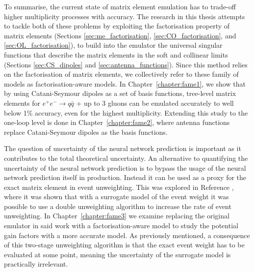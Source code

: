 \documentclass[main.tex]{subfiles}
\begin{document}
    To summarise, the current state of matrix element
    emulation has to trade-off higher multiplicity processes
    with accuracy. The research in this thesis attempts to
    tackle both of these problems by exploiting the factorisation
    property of matrix elements (Sections \ref{sec:me_factorisation},
    \ref{sec:CO_factorisation}, and \ref{sec:OL_factorisation}),
    to build into the emulator the universal singular functions
    that describe the matrix elements in the soft and collinear limits
    (Sections \ref{sec:CS_dipoles} and \ref{sec:antenna_functions}).
    Since this method relies on the factorisation of matrix
    elements, we collectively refer to these family of models
    as factorisation-aware models.
    In Chapter~\ref{chapter:fame1}, we show that by using
    Catani-Seymour dipoles as a set of basis functions, tree-level
    matrix elements for $e^{+}e^{-} \rightarrow q \bar{q}$ + up to 3 gluons
    can be emulated accurately to well below 1\% accuracy,
    even for the highest multiplicity. Extending this study
    to the one-loop level is done in Chapter~\ref{chapter:fame2},
    where antenna functions replace Catani-Seymour dipoles as
    the basis functions.

    The question of uncertainty of the neural network
    prediction is important as it contributes to the total
    theoretical uncertainty. An alternative to quantifying
    the uncertainty of the neural network prediction is to
    bypass the usage of the neural network prediction itself
    in production.
    Instead it can be used as a proxy for the exact matrix
    element in event unweighting. This was explored in
    Reference \cite{Danziger:2021eeg},
    where it was shown that with a surrogate model of the event
    weight it was possible to use a double unweighting
    algorithm to increase the rate of event unweighting.
    In Chapter~\ref{chapter:fame3} we examine replacing
    the original emulator in said work with a factorisation-aware
    model to study the potential gain factors with a more
    accurate model. As previously mentioned, a consequence of
    this two-stage unweighting
    algorithm is that the exact event weight has to be evaluated
    at some point, meaning the uncertainty of the surrogate
    model is practically irrelevant.
\end{document}
